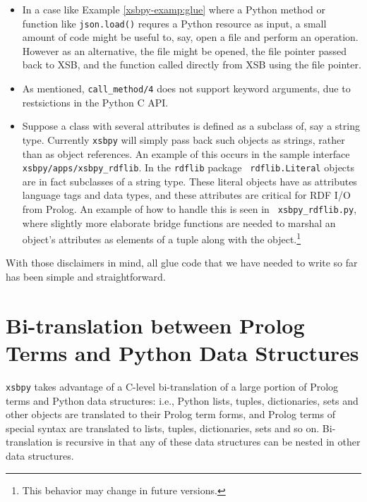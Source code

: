 \begin{itemize}
\item In a case like Example \ref{xsbpy-examp:glue} where a Python
  method or function like {\tt json.load()} requres a Python resource
  as input, a small amount of code might be useful to, say, open a
  file and perform an operation.  However as an alternative, the file
  might be opened, the file pointer passed back to XSB, and the
  function called directly from XSB using the file pointer.

  \item As mentioned, {\tt call\_method/4} does not support keyword
    arguments, due to restsictions in the Python C API.

  \item Suppose a class with several attributes is defined as a
    subclass of, say a string type.  Currently {\tt xsbpy} will simply
    pass back such objects as strings, rather than as object
    references.  An example of this occurs in the sample interface
    {\tt xsbpy/apps/xsbpy\_rdflib}.  In the {\tt rdflib} package {\tt
      rdflib.Literal} objects are in fact subclasses of a string type.
    These literal objects have as attributes language tags and data
    types, and these attributes are critical for RDF I/O from Prolog.
    An example of how to handle this is seen in {\tt
      xsbpy\_rdflib.py}, where slightly more elaborate bridge
    functions are needed to marshal an object's attributes as elements
    of a tuple along with the object.\footnote{This behavior may
      change in future versions.}
\end{itemize}

With those disclaimers in mind, all glue code that we have needed to
write so far has been simple and straightforward.

\section{Bi-translation between Prolog Terms and Python Data Structures} \label{sec:bi-translation}

{\tt xsbpy} takes advantage of a C-level bi-translation of a large
portion of Prolog terms and Python data structures: i.e., Python
lists, tuples, dictionaries, sets and other objects are translated to
their Prolog term forms, and Prolog terms of special syntax are
translated to lists, tuples, dictionaries, sets and so on.
Bi-translation is recursive in that any of these data structures can
be nested in other data structures.
     

